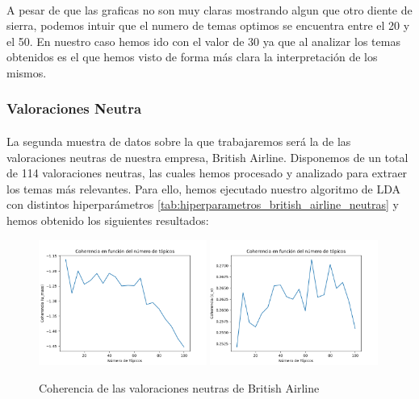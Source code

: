 \documentclass{report}
\begin{document}
{                    \paragraph*{}{
                        A pesar de que las graficas no son muy claras mostrando algun que otro diente de sierra, podemos intuir que el numero de temas optimos se encuentra entre el 20 y el 50.
                        En nuestro caso hemos ido con el valor de 30 ya que al analizar los temas obtenidos es el que hemos visto de forma más clara la interpretación de los mismos.
                    }
                \clearpage\subsubsection*{Valoraciones Neutra}
                    \paragraph*{}{
                        La segunda muestra de datos sobre la que trabajaremos será la de las valoraciones neutras de nuestra empresa, British Airline.
                        Disponemos de un total de 114 valoraciones neutras, las cuales hemos procesado y analizado para extraer los temas más relevantes.
                        Para ello, hemos ejecutado nuestro algoritmo de LDA con distintos hiperparámetros \ref{tab:hiperparametros_british_airline_neutras} y hemos obtenido los siguientes resultados:
                    }
                    \begin{figure}[H]
                        \centering
                        \includegraphics[width=0.49\textwidth]{./img/british_airline_neutras_umass.png}
                        \includegraphics[width=0.49\textwidth]{./img/british_airline_neutras_cv.png}
                        \caption{Coherencia de las valoraciones neutras de British Airline}
                    \end{figure}
}
\end{document}
